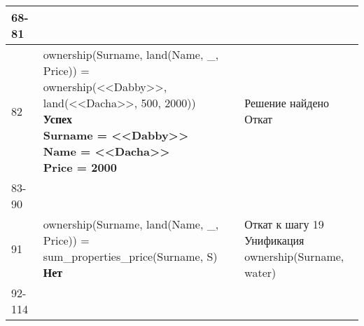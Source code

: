 \begin{table}[]
\begin{tabular}{|l|l|l|}
68-81  & \specialcell{...} & \specialcell{} \\ \hline
82  & \specialcell{ownership(Surname, land(Name, \_, Price)) = \\ ownership(<<Dabby>>, land(<<Dacha>>, 500, 2000)) \\ \textbf{Успех} \\ \textbf{Surname = <<Dabby>>} \\ \textbf{Name = <<Dacha>>} \\ \textbf{Price = 2000}} & \specialcell{Решение найдено \\ Откат} \\ \hline
83-90  & \specialcell{...} & \specialcell{} \\ \hline
91  & \specialcell{ownership(Surname, land(Name, \_, Price)) = \\ sum\_properties\_price(Surname, S) \\ \textbf{Нет}} & \specialcell{Откат к шагу 19 \\ Унификация \\ ownership(Surname, water)} \\ \hline
92-114  & \specialcell{...} & \specialcell{} \\ \hline

\end{tabular}
\end{table}

\newpage
\noindent

